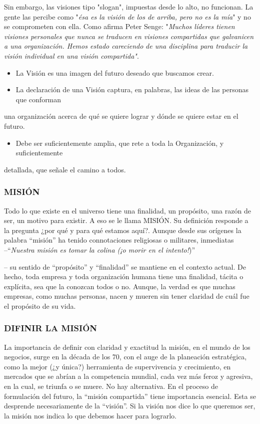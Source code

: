 Sin embargo, las visiones tipo "slogan", impuestas desde lo alto, no funcionan. La gente las percibe como "\textit{ésa es la visión de los de arriba, pero no es la mía}" y no se comprometen con ella. Como afirma Peter Senge: "\textit{Muchos líderes tienen visiones personales que nunca se} \textit{traducen en visiones compartidas que galvanicen a una organización. Hemos estado careciendo} \textit{de una disciplina para traducir la visión individual en una visión compartida"}.

\begin{itemize}
  \item La Visión es una imagen del futuro deseado que buscamos crear.
  \item La declaración de una Visión captura, en palabras, las ideas de las personas que conforman
\end{itemize}
una organización acerca de qué se quiere lograr y dónde se quiere estar en el futuro.

\begin{itemize}
  \item Debe ser suficientemente amplia, que rete a toda la Organización, y suficientemente
\end{itemize}
detallada, que señale el camino a todos.



\subsubsection*{MISIÓN}
Todo lo que existe en el universo tiene una finalidad, un propósito, una razón de ser, un motivo para existir. A eso se le llama MISIÓN. Su definición responde a la pregunta ¿por qué y para qué estamos aquí?. Aunque desde sus orígenes la palabra “misión” ha tenido connotaciones religiosas o militares, inmediatas –“\textit{Nuestra misión es tomar la colina (¡o morir en el intento!})”

– su sentido de “propósito” y “finalidad” se mantiene en el contexto actual. De hecho, toda empresa y toda organización humana tiene una finalidad, tácita o explícita, sea que la conozcan todos o no. Aunque, la verdad es que muchas empresas, como muchas personas, nacen y mueren sin tener claridad de cuál fue el propósito de su vida.

\subsubsection*{DIFINIR LA MISIÓN}
La importancia de definir con claridad y exactitud la misión, en el mundo de los negocios, surge en la década de los 70, con el auge de la planeación estratégica, como la mejor (¿y única?) herramienta de supervivencia y crecimiento, en mercados que se abrían a la competencia mundial, cada vez más feroz y agresiva, en la cual, se triunfa o se muere. No hay alternativa. En el proceso de formulación del futuro, la “misión compartida” tiene importancia esencial. Esta se desprende necesariamente de la “visión”. Si la visión nos dice lo que queremos ser, la misión nos indica lo que debemos hacer para lograrlo.

